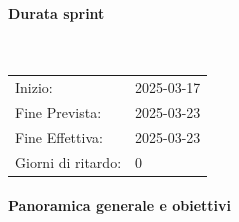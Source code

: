 \documentclass[10pt]{article}
\begin{document}
{{{{{{{{{    \paragraph{Durata sprint}\mbox{}\\
        \vspace{-1.5em}
        \begin{table}[h] 
        \renewcommand{\arraystretch}{1.2}  
        \begin{tabular}{ l l }
            Inizio: & 2025-03-17 \\
            Fine Prevista: & 2025-03-23 \\
            Fine Effettiva: & 2025-03-23 \\
            Giorni di ritardo: & 0 \\
        \end{tabular}
        \end{table}
        \vspace{-2em}
        {\renewcommand{\arraystretch}{1.5}%
        
        \paragraph{Panoramica generale e obiettivi}\mbox{}\vspace{0.4em}
        
}}}}}}}}}}
\end{document}
